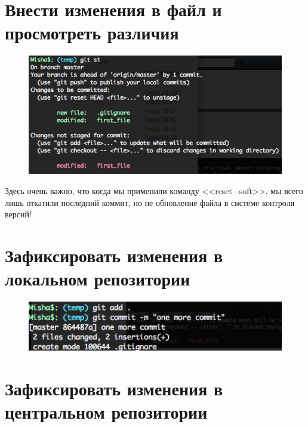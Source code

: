 \documentclass[utf8x, 12pt]{G7-32}
\begin{document}
\section{Внести изменения в файл и просмотреть различия}

\begin{figure}[hhh!]
	\begin{center}
		\includegraphics[width=12cm]{img/9}
	\end{center}
\end{figure}

Здесь очень важно, что когда мы применили команду <<reset --soft>>, мы всего лишь откатили последний коммит, но не обновление файла в системе контроля версий!

\section{Зафиксировать изменения в локальном репозитории}

\begin{figure}[hhh!]
	\begin{center}
		\includegraphics[width=12cm]{img/10}
	\end{center}
\end{figure}

\newpage

\section{Зафиксировать изменения в центральном репозитории}
\end{document}

